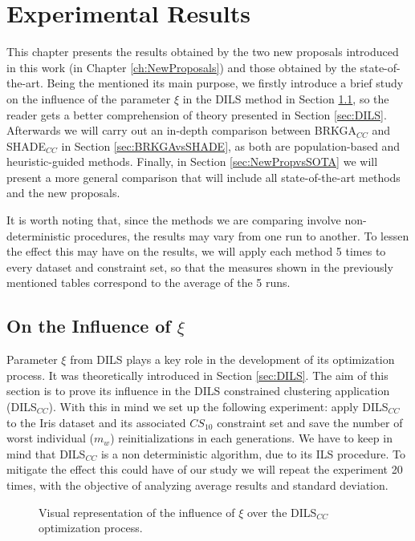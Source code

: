 \chapter{Experimental Results} \label{ch:ExperimentalResults}

This chapter presents the results obtained by the two new proposals introduced in this work (in Chapter \ref{ch:NewProposals}) and those obtained by the state-of-the-art. Being the mentioned its main purpose, we firstly introduce a brief study on the influence of the parameter $\xi$ in the \acs{DILS} method in Section \ref{sec:XiInfl}, so the reader gets a better comprehension of theory presented in Section \ref{sec:DILS}. Afterwards we will carry out an in-depth comparison between \acs{BRKGA}$_{CC}$ and \acs{SHADE}$_{CC}$ in Section \ref{sec:BRKGAvsSHADE}, as both are population-based and heuristic-guided methods. Finally, in Section \ref{sec:NewPropvsSOTA}  we will present a more general comparison that will include all state-of-the-art methods and the new proposals.

It is worth noting that, since the methods we are comparing involve non-deterministic procedures, the results may vary from one run to another. To lessen the effect this may have on the results, we will apply each method 5 times to every dataset and constraint set, so that the measures shown in the previously mentioned tables correspond to the average of the 5 runs.

\section{On the Influence of $\xi$} \label{sec:XiInfl}

Parameter $\xi$ from \acs{DILS} plays a key role in the development of its optimization process. It was theoretically introduced in Section \ref{sec:DILS}. The aim of this section is to prove its influence in the \acs{DILS} constrained clustering application (\acs{DILS}$_{CC}$). With this in mind we set up the following experiment: apply \acs{DILS}$_{CC}$ to the Iris dataset and its associated $CS_{10}$ constraint set and save the number of worst individual ($m_w$) reinitializations in each generations. We have to keep in mind that \acs{DILS}$_{CC}$ is a non deterministic algorithm, due to its \acf{ILS} procedure. To mitigate the effect this could have of our study we will repeat the experiment 20 times, with the objective of analyzing average results and standard deviation.

\begin{figure}[bth]
	\myfloatalign
	\hspace{1cm}
	\caption{Visual representation of the influence of $\xi$ over the \acs{DILS}$_{CC}$ optimization process.}
	\label{fig:RestartsLines}
\end{figure}

